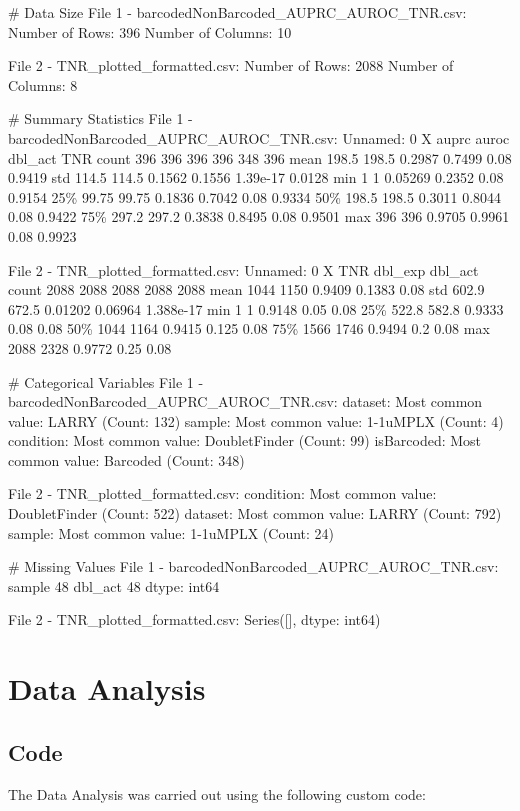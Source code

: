\documentclass[11pt]{article}
\begin{document}
\begin{codeoutput}
\# Data Size
File 1 - barcodedNonBarcoded\_AUPRC\_AUROC\_TNR.csv:
Number of Rows: 396
Number of Columns: 10

File 2 - TNR\_plotted\_formatted.csv:
Number of Rows: 2088
Number of Columns: 8

\# Summary Statistics
File 1 - barcodedNonBarcoded\_AUPRC\_AUROC\_TNR.csv:
       Unnamed: 0     X   auprc  auroc  dbl\_act    TNR
count         396   396     396    396      348    396
mean        198.5 198.5  0.2987 0.7499     0.08 0.9419
std         114.5 114.5  0.1562 0.1556 1.39e-17 0.0128
min             1     1 0.05269 0.2352     0.08 0.9154
25\%         99.75 99.75  0.1836 0.7042     0.08 0.9334
50\%         198.5 198.5  0.3011 0.8044     0.08 0.9422
75\%         297.2 297.2  0.3838 0.8495     0.08 0.9501
max           396   396  0.9705 0.9961     0.08 0.9923

File 2 - TNR\_plotted\_formatted.csv:
       Unnamed: 0     X     TNR  dbl\_exp   dbl\_act
count        2088  2088    2088     2088      2088
mean         1044  1150  0.9409   0.1383      0.08
std         602.9 672.5 0.01202  0.06964 1.388e-17
min             1     1  0.9148     0.05      0.08
25\%         522.8 582.8  0.9333     0.08      0.08
50\%          1044  1164  0.9415    0.125      0.08
75\%          1566  1746  0.9494      0.2      0.08
max          2088  2328  0.9772     0.25      0.08

\# Categorical Variables
File 1 - barcodedNonBarcoded\_AUPRC\_AUROC\_TNR.csv:
dataset: Most common value: LARRY (Count: 132)
sample: Most common value: 1-1uMPLX (Count: 4)
condition: Most common value: DoubletFinder (Count: 99)
isBarcoded: Most common value: Barcoded (Count: 348)

File 2 - TNR\_plotted\_formatted.csv:
condition: Most common value: DoubletFinder (Count: 522)
dataset: Most common value: LARRY (Count: 792)
sample: Most common value: 1-1uMPLX (Count: 24)

\# Missing Values
File 1 - barcodedNonBarcoded\_AUPRC\_AUROC\_TNR.csv:
sample     48
dbl\_act    48
dtype: int64

File 2 - TNR\_plotted\_formatted.csv:
Series([], dtype: int64)
\end{codeoutput}

\section{Data Analysis}
\subsection{{Code}}
The Data Analysis was carried out using the following custom code:
\end{document}
